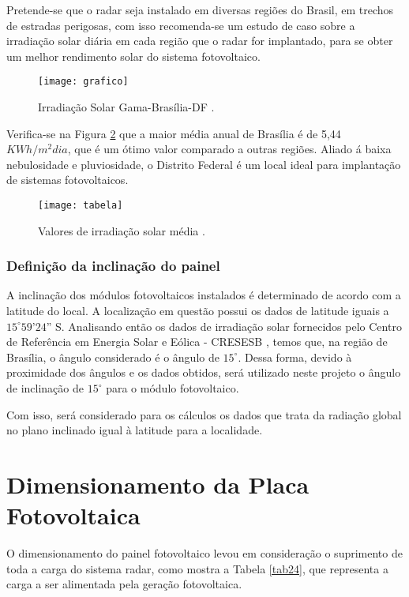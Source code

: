 Pretende-se que o radar seja instalado em diversas regiões do Brasil, em trechos de estradas perigosas, com isso recomenda-se um estudo de caso sobre a irradiação solar diária em cada região que o radar for implantado, para se obter um melhor rendimento solar do sistema fotovoltaico. 
\begin{figure}[H]
\centering
\texttt{[image: grafico]}
\caption{Irradiação Solar Gama-Brasília-DF \cite{solar}.}
\label{fig:grafico}
\end{figure}

Verifica-se na Figura \ref{fig:tabela} que a maior média anual de Brasília é de 5,44 $KWh/m^2dia$, que é um ótimo valor comparado a outras regiões. Aliado á baixa nebulosidade e pluviosidade, o Distrito Federal é um local ideal para implantação de sistemas fotovoltaicos.

\begin{figure}[H]
\centering
\texttt{[image: tabela]}
\caption{Valores de irradiação solar média \cite{solar}.}
\label{fig:tabela}
\end{figure}

\subsubsection{Definição da inclinação do painel}

A inclinação dos módulos fotovoltaicos instalados é determinado de acordo com a latitude do local. A localização em questão possui os dados de latitude iguais a $15^{\circ}59’24”$ S. Analisando então os dados de irradiação solar fornecidos pelo Centro de Referência em Energia Solar e Eólica - CRESESB \cite{solar}, temos que, na região de Brasília, o ângulo considerado é o ângulo de $15^{\circ}$. Dessa forma, devido à proximidade dos ângulos e os dados obtidos, será utilizado neste projeto o ângulo de inclinação de $15^{\circ}$ para o módulo fotovoltaico.

Com isso, será considerado para os  cálculos os dados que  trata da radiação global no plano inclinado  igual à latitude para a localidade.
 
 
\section{Dimensionamento da Placa Fotovoltaica}

O dimensionamento do painel fotovoltaico levou em consideração o suprimento de toda a carga do sistema radar, como mostra a Tabela \ref{tab24}, que representa a carga a ser alimentada pela geração fotovoltaica. 

